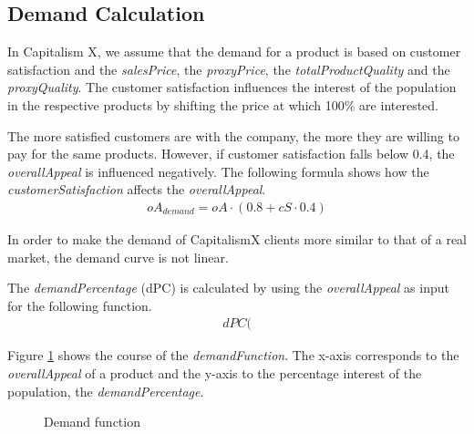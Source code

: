 \subsection{Demand Calculation} \label{demandCalc}

In Capitalism X, we assume that the demand for a product is based on customer satisfaction and the \textit{salesPrice}, the \textit{proxyPrice}, the \textit{totalProductQuality} and the \textit{proxyQuality}. 
The customer satisfaction influences the interest of the population in the respective products by shifting the price at which 100\% are interested.
 
The more satisfied customers are with the company, the more they are willing to pay for the same products. However, if customer satisfaction falls below 0.4, the \textit{overallAppeal} is influenced negatively. The following formula shows how the \textit{customerSatisfaction} affects the \textit{overallAppeal}.
\begin{equation}
\label{func:demandPrice}
\begin{aligned}
 oA_{demand} = oA \cdot (0.8 + cS \cdot 0.4)
\end{aligned}
\end{equation}

In order to make the demand of CapitalismX clients more similar to that of a real market, the demand curve is not linear. 

The \textit{demandPercentage} (\gls{dPC}) is calculated by using the \textit{overallAppeal} as input for the following function. 
\begin{equation}
\label{func:demandPercentage}
\begin{aligned}
dPC(
\end{aligned}
\end{equation}

Figure \ref{demand_function} shows the course of the \textit{demandFunction}. The x-axis corresponds to the \textit{overallAppeal} of a product and the y-axis to the percentage interest of the population, the \textit{demandPercentage}. 

\begin{figure}[h]
\centering
{}
	\caption{Demand function}
	\label{demand_function}
\end{figure}

